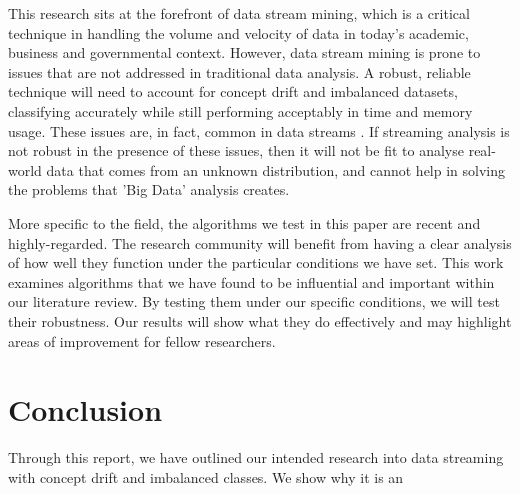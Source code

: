 \documentclass[11pt]{article}\usepackage[]{graphicx}\usepackage[]{color}
\begin{document}
This research sits at the forefront of data stream mining, which is a critical technique in handling the volume and velocity of data in today's academic, business and governmental context. However, data stream mining is prone to issues that are not addressed in traditional data analysis. A robust, reliable technique will need to account for concept drift and imbalanced datasets, classifying accurately while still performing acceptably in time and memory usage. These issues are, in fact, common in data streams \cite{wan}. If streaming analysis is not robust in the presence of these issues, then it will not be fit to analyse real-world data that comes from an unknown distribution, and cannot help in solving the problems that 'Big Data' analysis creates.

More specific to the field, the algorithms we test in this paper are recent and highly-regarded. The research community will benefit from having a clear analysis of how well they function under the particular conditions we have set. This work examines algorithms that we have found to be influential and important within our literature review. By testing them under our specific conditions, we will test their robustness. Our results will show what they do effectively and may highlight areas of improvement for fellow researchers.

\section{Conclusion}

Through this report, we have outlined our intended research into data streaming with concept drift and imbalanced classes. We show why it is an

\newpage


\end{document}
